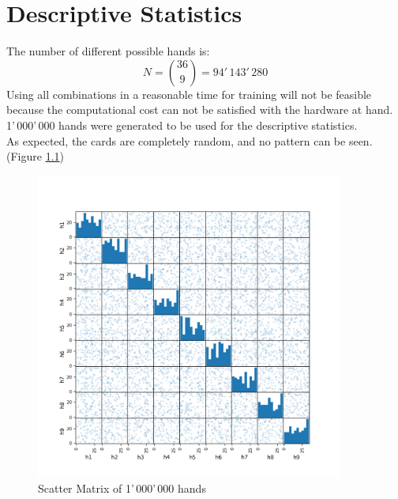 
\chapter{Descriptive Statistics} %

\label{Chapter3} %



The number of different possible hands is:
\[ N = {36\choose 9}  = 94'\,143'\,280 \]
Using all combinations in a reasonable time for training will not be feasible because the computational cost can not be satisfied with the hardware at hand.
1'\,000'\,000 hands were generated to be used for the descriptive statistics. \\

As expected, the cards are completely random, and no pattern can be seen. (Figure \ref{fig:scatter_matrix})

\begin{figure}[ht!]
    \centering
    \includegraphics[width=0.9\textwidth]{Figures/scatter_matrix_hand}
    \decoRule
    \caption[Scatter Matrix of 1'\,000'\,000 hands]{Scatter Matrix of 1'\,000'\,000 hands}
    \label{fig:scatter_matrix}
\end{figure} 

